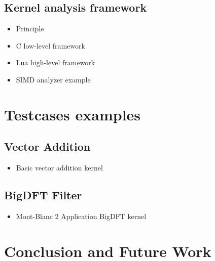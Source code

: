 \documentclass[11pt, a4paper, twoside]{montblanc2}
\begin{document}
\subsection{Kernel analysis framework}

\begin{itemize}
  \item Principle
  \item C low-level framework
  \item Lua high-level framework
  \item SIMD analyzer example
\end{itemize}

\section{Testcases examples}

  \subsection{Vector Addition}
\begin{itemize}
  \item Basic vector addition kernel
\end{itemize}

  \subsection{BigDFT Filter}
\begin{itemize}
  \item Mont-Blanc 2 Application BigDFT kernel
\end{itemize}

\section{Conclusion and Future Work}
\end{document}
